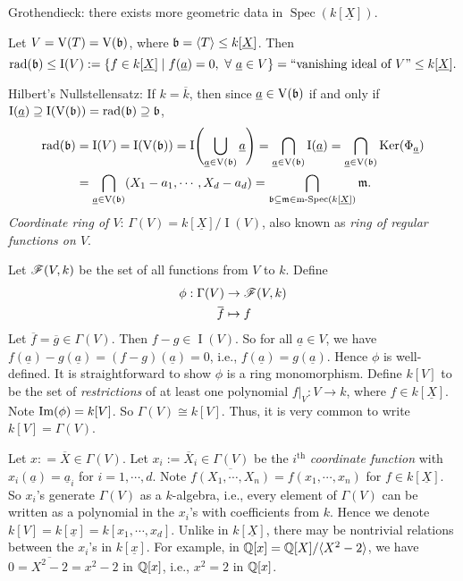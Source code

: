 \begin{construction*}
    Grothendieck: there exists more geometric data in $\operatorname{Spec}(k[\underline X])$. \par 
    Let $V = \operatorname{V}(T) = \operatorname{V}(\mathfrak{b})$, where $\mathfrak{b} = \langle T \rangle \leq k[\underline X]$. Then
    \[\operatorname{rad}(\mathfrak{b}) \leq \operatorname{I}(V) := \{f \in k[\underline X] \mid f(\underline a) = 0,\ \forall \  \underline a \in V\} = \text{``vanishing ideal of $V$''} \leq k[\underline X].\]
    \par Hilbert's Nullstellensatz: If $k = \overline k$, then since $\underline a \in \operatorname{V}(\mathfrak{b})$ if and only if $\operatorname{I}(\underline a) \supseteq \operatorname{I}(\operatorname{V}(\mathfrak{b})) = \operatorname{rad}(\mathfrak{b}) \supseteq \mathfrak{b}$,
    \begin{align*}
        \operatorname{rad}(\mathfrak{b}) &= \operatorname{I}(V) = \operatorname{I}(\operatorname{V}(\mathfrak{b})) = \operatorname{I}\Biggl(\bigcup_{\underline a \in \operatorname{V}(\mathfrak{b})} \underline a \Biggr) = \bigcap_{\underline a \in \operatorname{V}(\mathfrak{b})} \operatorname{I}(\underline a) = \bigcap_{\underline a \in \operatorname{V}(\mathfrak{b})} \operatorname{Ker}(\Phi_{\underline a}) \\
        &= \bigcap_{\underline a \in \operatorname{V}(\mathfrak{b})} (X_1-a_1,\cdots,X_d-a_d) = \bigcap_{\mathfrak{b} \subseteq \mathfrak{m} \in \operatorname{m-Spec}(k[\underline X])} \mathfrak{m}.
    \end{align*}
    \emph{Coordinate ring of $V$}: $\Gamma(V) = k[\underline X]/\operatorname{I}(V)$, also known as \emph{ring of regular functions on $V$}. \par 
    Let $\mathscr{F}(V,k)$ be the set of all functions from $V$ to $k$. Define
    \begin{align*}
        \phi: \Gamma(V) & \to \ssF(V,k) \\
        \overbar f &\mapsto f
    \end{align*}
    Let $\overbar f = \overbar g \in \Gamma(V)$. Then $f-g \in \operatorname{I}(V)$. So for all $\underline a \in V$, we have $f(\underline a)-g(\underline a) = (f-g)(\underline a) = 0$, i.e., $f(\underline a) = g(\underline a)$. Hence $\phi$ is well-defined. It is straightforward to show $\phi$ is a ring monomorphism. Define $k[V]$ to be the set of \emph{restrictions} of at least one polynomial $f|_V: V \to k$, where $f \in k[\underline X]$. Note $\operatorname{Im}(\phi) = k[V]$. So $\Gamma(V) \cong k[V]$. Thus, it is very common to write $k[V] = \Gamma(V)$. \par
    Let $x: = \overbar{X} \in \Gamma(V)$. Let $x_i := \overbar X_i \in \Gamma(V)$ be the $i^{\text{th}}$ \emph{coordinate function} with $x_i(\underline a) = \underline a_i$ for $i = 1,\cdots,d$. Note $\overbar{f(X_1,\cdots,X_n)} = f(x_1,\cdots,x_n)$ for $f \in k[\underline X]$. So $x_i$'s generate $\Gamma(V)$ as a $k$-algebra, i.e., every element of $\Gamma(V)$ can be written as a polynomial in the $x_i$'s with coefficients from $k$. Hence we denote $k[V]=k[\underline x] = k[x_1,\cdots,x_d]$. Unlike in $k[\underline X]$, there may be nontrivial relations between the $x_i$'s in $k[\underline x]$. For example, in $\mathbb{Q}[x] = \mathbb{Q}[X]/\langle X^2-2 \rangle$, we have $0 = \overbar {X^2-2} = x^{2} - 2$ in $\mathbb{Q}[x]$, i.e., $x^{2} = 2$ in $\mathbb{Q}[x]$. \par 

\end{construction*}
